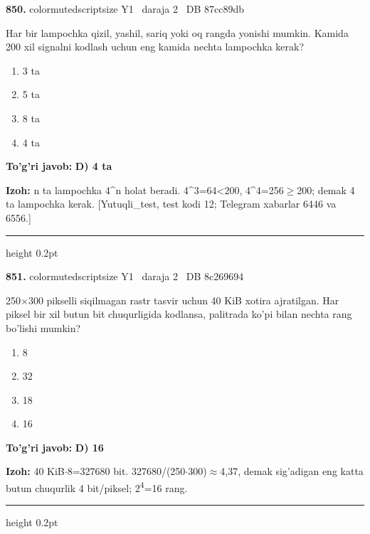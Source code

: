 \documentclass[10pt,a4paper,oneside]{article}
\begin{document}
\noindent\textbf{\color{ink}850.}  {color{muted}scriptsize Y1 \textbullet\ daraja 2 \textbullet\ DB 87cc89db}
\par
Har bir lampochka qizil, yashil, sariq yoki oq rangda yonishi mumkin. Kamida 200 xil signalni kodlash uchun eng kamida nechta lampochka kerak?
\begin{enumerate}[label=\Alph*),leftmargin=9mm]
\item 3 ta
\item 5 ta
\item 8 ta
\item 4 ta
\end{enumerate}
\begin{tcolorbox}[enhanced,breakable,colback=teal!4,colframe=teal!50!black,boxrule=0.5pt,arc=1.1mm,left=3mm,right=3mm,top=1.7mm,bottom=1.7mm,before skip=2mm,after skip=2mm]
\textbf{\color{teal}To'g'ri javob:} \textbf{D) 4 ta}
\par\smallskip
\textbf{Izoh:} n ta lampochka 4\textasciicircum{}n holat beradi. 4\textasciicircum{}3=64\textless{}200, 4\textasciicircum{}4=256\ensuremath{\geq}200; demak 4 ta lampochka kerak. [Yutuqli\_test, test kodi 12; Telegram xabarlar 6446 va 6556.]
\end{tcolorbox}
\vspace{2mm}\hrule height 0.2pt \vspace{3mm}

\noindent\textbf{\color{ink}851.}  {color{muted}scriptsize Y1 \textbullet\ daraja 2 \textbullet\ DB 8c269694}
\par
250\ensuremath{\times}300 pikselli siqilmagan rastr tasvir uchun 40 KiB xotira ajratilgan. Har piksel bir xil butun bit chuqurligida kodlansa, palitrada ko'pi bilan nechta rang bo'lishi mumkin?
\begin{enumerate}[label=\Alph*),leftmargin=9mm]
\item 8
\item 32
\item 18
\item 16
\end{enumerate}
\begin{tcolorbox}[enhanced,breakable,colback=teal!4,colframe=teal!50!black,boxrule=0.5pt,arc=1.1mm,left=3mm,right=3mm,top=1.7mm,bottom=1.7mm,before skip=2mm,after skip=2mm]
\textbf{\color{teal}To'g'ri javob:} \textbf{D) 16}
\par\smallskip
\textbf{Izoh:} 40 KiB\ensuremath{\cdot}8=327680 bit. 327680/(250\ensuremath{\cdot}300)\ensuremath{\approx}4,37, demak sig'adigan eng katta butun chuqurlik 4 bit/piksel; 2\textsuperscript{4}=16 rang.
\end{tcolorbox}
\vspace{2mm}\hrule height 0.2pt \vspace{3mm}
\end{document}

